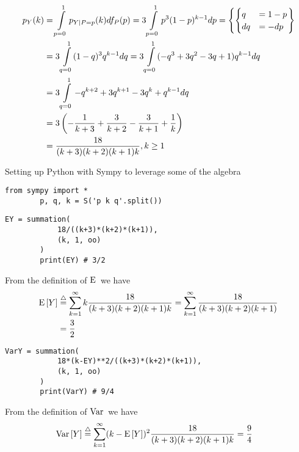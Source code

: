 \documentclass[a4paper,twoside=false,abstract=false,numbers=noenddot,
titlepage=false,headings=small,parskip=half,version=last]{scrartcl}
\begin{document}
\begin{solution}
    \begin{align}
        p_{Y} (k) &= \int\limits_{p=0}^1 p_{Y|P=p} (k) df_P(p) =
        3\int\limits_{p=0}^1 p^3 (1-p)^{k-1}dp = \left\{
            \begin{cases}
                q   & = 1-p \\
                dq  & = -dp
            \end{cases}
        \right\} \nonumber \\ & =
        3\int\limits_{q=0}^1 (1-q)^3 q^{k-1} dq =
        3\int\limits_{q=0}^1 (-q^3+3 q^2-3 q+1) q^{k-1} dq \nonumber \\ & =
        3\int\limits_{q=0}^1 -q^{k+2}+3q^{k+1}-3q^k+q^{k-1} dq \nonumber \\ & =
        3\left(-\frac{1}{k+3}+\frac{3}{k+2}-\frac{3}{k+1}+\frac{1}{k}\right) \nonumber \\ & =
        \frac{18}{(k+3)(k+2)(k+1)k}, k \ge 1
    \end{align} %

    Setting up Python with Sympy to leverage some of the algebra \\
    \begin{lstlisting}[frame=single]
        from sympy import *
        p, q, k = S('p k q'.split())
    \end{lstlisting}

    \begin{lstlisting}[frame=single]
        EY = summation(
            18/((k+3)*(k+2)*(k+1)),
            (k, 1, oo)
        )
        print(EY) # 3/2
    \end{lstlisting}
    From the definition of ${\rm E}\,$ we have
    \begin{align}
        \Expected[Y] & \eqdef \sum\limits_{k=1}^\infty k
        \frac{18}{(k+3)(k+2)(k+1)k} =
        \sum\limits_{k=1}^\infty \frac{18}{(k+3)(k+2)(k+1)} \nonumber \\ & =
        \frac{3}{2}
    \end{align}
    \begin{lstlisting}[frame=single]
        VarY = summation(
            18*(k-EY)**2/((k+3)*(k+2)*(k+1)),
            (k, 1, oo)
        )
        print(VarY) # 9/4
    \end{lstlisting}
    From the definition of ${\rm Var}\,$ we have
    \begin{align}
        \Variance[Y] & \eqdef \sum\limits_{k=1}^\infty (k - \Expected[Y])^2
        \frac{18}{(k+3)(k+2)(k+1)k} =
        \frac{9}{4}
    \end{align}


\end{solution}
\end{document}

